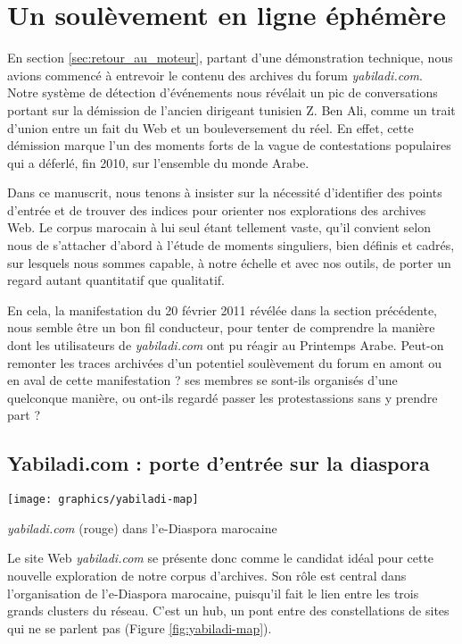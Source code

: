 \documentclass[symmetric,justified,marginals=raggedouter]{tufte-book}
\begin{document}
\section{Un soulèvement en ligne éphémère}
\label{sec:6_printemps}

\noindent En section \ref{sec:retour_au_moteur}, partant d'une démonstration technique, nous avions commencé à entrevoir le contenu des archives du forum \textit{yabiladi.com}. Notre système de détection d'événements nous révélait un pic de conversations portant sur la démission de l'ancien dirigeant tunisien Z. Ben Ali, comme un trait d'union entre un fait du Web et un bouleversement du réel. En effet, cette démission marque l'un des moments forts de la vague de contestations populaires qui a déferlé, fin 2010, sur l'ensemble du monde Arabe.

Dans ce manuscrit, nous tenons à insister sur la nécessité d'identifier des points d'entrée et de trouver des indices pour orienter nos explorations des archives Web. Le corpus marocain à lui seul étant tellement vaste, qu'il convient selon nous de s'attacher d'abord à l'étude de moments singuliers, bien définis et cadrés, sur lesquels nous sommes capable, à notre échelle et avec nos outils, de porter un regard autant quantitatif que qualitatif. 

En cela, la manifestation du 20 février 2011 révélée dans la section précédente, nous semble être un bon fil conducteur, pour tenter de comprendre la manière dont les utilisateurs de \textit{yabiladi.com} ont pu réagir au Printemps Arabe. Peut-on remonter les traces archivées d'un potentiel soulèvement du forum en amont ou en aval de cette manifestation ? ses membres se sont-ils organisés d'une quelconque manière, ou ont-ils regardé passer les protestassions sans y prendre part ? 

\subsection{Yabiladi.com : porte d'entrée sur la diaspora}

\begin{marginfigure}%
  \texttt{[image: graphics/yabiladi-map]}
  \vspace*{0.2cm}  
  \caption{\textit{yabiladi.com} (rouge) dans l'e-Diaspora marocaine}
  \label{fig:yabiladi-map}
\end{marginfigure} 

\noindent Le site Web \textit{yabiladi.com} se présente donc comme le candidat idéal pour cette nouvelle exploration de notre corpus d'archives.  Son rôle est central dans l'organisation de l'e-Diaspora marocaine, puisqu'il fait le lien entre les trois grands clusters du réseau. C'est un hub, un pont entre des constellations de sites qui ne se parlent pas (Figure \ref{fig:yabiladi-map}).
\end{document}
